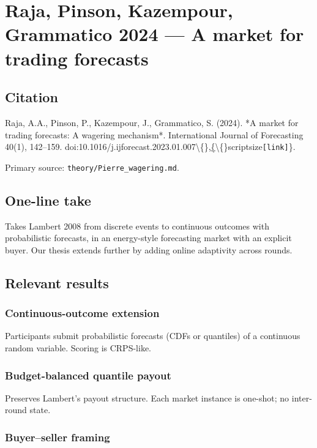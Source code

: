\documentclass[11pt,a4paper,openany]{report}
\begin{document}
\chapter{Raja, Pinson, Kazempour, Grammatico 2024 — A market for trading forecasts}

\section{Citation}

Raja, A.A., Pinson, P., Kazempour, J., Grammatico, S. (2024). *A market
for trading forecasts: A wagering mechanism*. International Journal of
Forecasting 40(1), 142–159. doi:10.1016/j.ijforecast.2023.01.007\textbackslash\{\},\href{https://doi.org/10.1016/j.ijforecast.2023.01.007}\{\textbackslash\{\}scriptsize\texttt{[link]}\}.

Primary source: \texttt{theory/Pierre\_wagering.md}.

\section{One-line take}

Takes Lambert 2008 from discrete events to continuous outcomes with
probabilistic forecasts, in an energy-style forecasting market with an
explicit buyer. Our thesis extends further by adding online adaptivity
across rounds.

\section{Relevant results}

\subsection{Continuous-outcome extension}

Participants submit probabilistic forecasts (CDFs or quantiles) of a
continuous random variable. Scoring is CRPS-like.

\subsection{Budget-balanced quantile payout}

Preserves Lambert's payout structure. Each market instance is
one-shot; no inter-round state.

\subsection{Buyer–seller framing}
\end{document}

